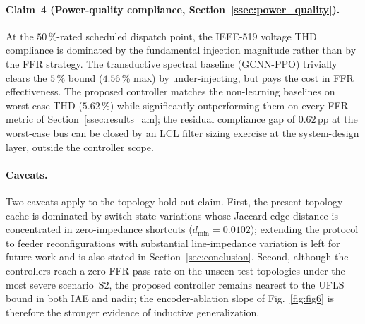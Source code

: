 \paragraph{Claim~4 (Power-quality compliance,
Section~\ref{ssec:power_quality}).}
At the $50$\,\%-rated scheduled dispatch point, the IEEE-519 voltage
THD compliance is dominated by the fundamental injection magnitude
rather than by the FFR strategy. The transductive spectral baseline
(GCNN-PPO) trivially clears the $5$\,\% bound ($4.56$\,\% max) by
under-injecting, but pays the cost in FFR effectiveness. The
proposed controller matches the non-learning baselines on worst-case
THD ($5.62$\,\%) while significantly outperforming them on every
FFR metric of Section~\ref{ssec:results_am}; the residual
compliance gap of $0.62$\,pp at the worst-case bus can be closed by
an LCL filter sizing exercise at the system-design layer, outside
the controller scope.

\paragraph{Caveats.}
Two caveats apply to the topology-hold-out claim. First, the
present topology cache is dominated by switch-state variations whose
Jaccard edge distance is concentrated in zero-impedance shortcuts
($\overline{d_{\min}}=0.0102$); extending the protocol to feeder
reconfigurations with substantial line-impedance variation is left
for future work and is also stated in Section~\ref{sec:conclusion}.
Second, although the controllers reach a zero FFR pass rate on the
unseen test topologies under the most severe scenario~S2, the
proposed controller remains nearest to the UFLS bound in both IAE
and nadir; the encoder-ablation slope of Fig.~\ref{fig:fig6} is
therefore the stronger evidence of inductive generalization.
